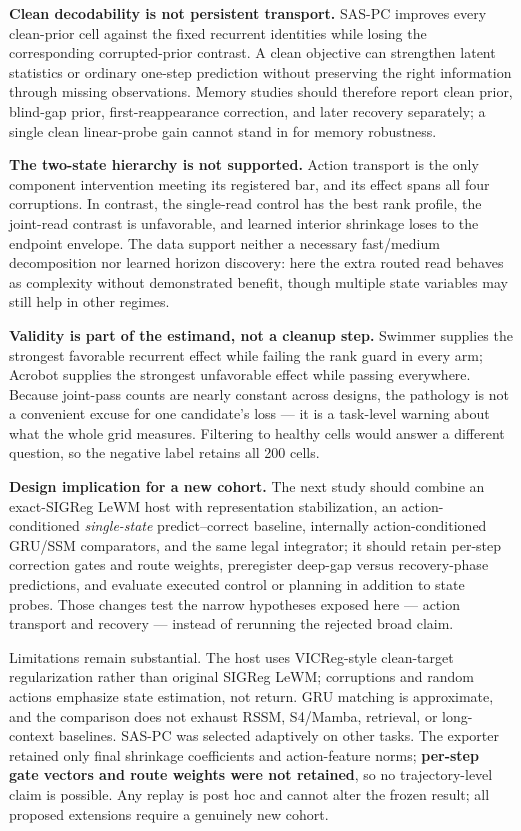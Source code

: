 \textbf{Clean decodability is not persistent transport.} SAS-PC improves
every clean-prior cell against the fixed recurrent identities while
losing the corresponding corrupted-prior contrast. A clean objective can
strengthen latent statistics or ordinary one-step prediction without
preserving the right information through missing observations. Memory
studies should therefore report clean prior, blind-gap prior,
first-reappearance correction, and later recovery separately; a single
clean linear-probe gain cannot stand in for memory robustness.

\textbf{The two-state hierarchy is not supported.} Action transport is
the only component intervention meeting its registered bar, and its
effect spans all four corruptions. In contrast, the single-read control
has the best rank profile, the joint-read contrast is unfavorable, and
learned interior shrinkage loses to the endpoint envelope. The data
support neither a necessary fast/medium decomposition nor learned
horizon discovery: here the extra routed read behaves as complexity
without demonstrated benefit, though multiple state variables may still
help in other regimes.

\textbf{Validity is part of the estimand, not a cleanup step.} Swimmer
supplies the strongest favorable recurrent effect while failing the rank
guard in every arm; Acrobot supplies the strongest unfavorable effect
while passing everywhere. Because joint-pass counts are nearly constant
across designs, the pathology is not a convenient excuse for one
candidate's loss --- it is a task-level warning about what the whole
grid measures. Filtering to healthy cells would answer a different
question, so the negative label retains all 200 cells.

\textbf{Design implication for a new cohort.} The next study should
combine an exact-SIGReg LeWM host with representation stabilization, an
action-conditioned \emph{single-state} predict--correct baseline,
internally action-conditioned GRU/SSM comparators, and the same legal
integrator; it should retain per-step correction gates and route
weights, preregister deep-gap versus recovery-phase predictions, and
evaluate executed control or planning in addition to state probes. Those
changes test the narrow hypotheses exposed here --- action transport and
recovery --- instead of rerunning the rejected broad claim.

Limitations remain substantial. The host uses VICReg-style clean-target
regularization rather than original SIGReg LeWM; corruptions and random
actions emphasize state estimation, not return. GRU matching is
approximate, and the comparison does not exhaust RSSM, S4/Mamba,
retrieval, or long-context baselines. SAS-PC was selected adaptively on
other tasks. The exporter retained only final shrinkage coefficients and
action-feature norms; \textbf{per-step gate vectors and route weights
were not retained}, so no trajectory-level claim is possible. Any replay
is post hoc and cannot alter the frozen result; all proposed extensions
require a genuinely new cohort.

